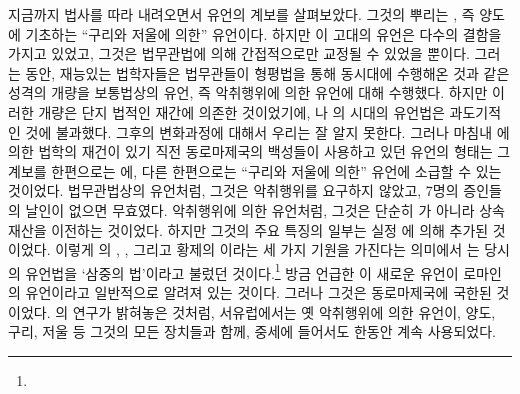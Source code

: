 지금까지 법사를 따라 내려오면서 유언의 계보를 살펴보았다.
그것의 뿌리는 ,
%
즉 양도에 기초하는 ``구리와 저울에 의한'' 유언이다.
하지만 이 고대의 유언은 다수의 결함을 가지고 있었고,
그것은 법무관법에 의해 간접적으로만 교정될 수 있었을 뿐이다.
그러는 동안, 재능있는 법학자들은
법무관들이 형평법을 통해 동시대에 수행해온 것과 같은 성격의 개량을
보통법상의 유언, 즉 악취행위에 의한 유언에 대해 수행했다.
하지만 이러한 개량은 단지 법적인 재간에 의존한 것이었기에,
나 의 시대의 유언법은 과도기적인 것에 불과했다.
그후의 변화과정에 대해서 우리는 잘 알지 못한다.
그러나 마침내 에 의한 법학의 재건이 있기 직전
동로마제국의 백성들이 사용하고 있던 유언의 형태는
그 계보를 한편으로는 에,
다른 한편으로는 ``구리와 저울에 의한'' 유언에 소급할 수 있는
것이었다.
법무관법상의 유언처럼, 그것은 악취행위를 요구하지 않았고,
7명의 증인들의 날인이 없으면 무효였다.
%
악취행위에 의한 유언처럼, 그것은 단순히 가 아니라
상속재산을 이전하는 것이었다.
하지만 그것의 주요 특징의 일부는 실정 에 의해 추가된 것이었다.
이렇게 의 , , 그리고 황제의 이라는
세 가지 기원을 가진다는 의미에서
는 당시의 유언법을
`삼중의 법'이라고 불렀던 것이다.\footnote{}
방금 언급한 이 새로운 유언이
로마인의 유언이라고
일반적으로
알려져 있는 것이다.
그러나 그것은 동로마제국에 국한된 것이었다.
의 연구가 밝혀놓은 것처럼,
%
서유럽에서는 옛 악취행위에 의한 유언이,
양도, 구리, 저울 등 그것의 모든 장치들과 함께,
중세에 들어서도 한동안 계속 사용되었다.

